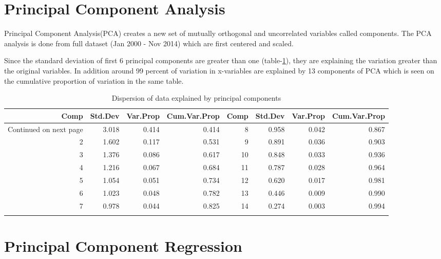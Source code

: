 \documentclass[12pt, lot, lof]{thesis}\usepackage[]{graphicx}\usepackage[]{color}
\begin{document}

\section{Principal Component Analysis}
\label{sec:pcaAnalysis}

Principal Component Analysis(PCA) creates a new set of mutually orthogonal and uncorrelated variables called components. The PCA analysis is done from full dataset (Jan 2000 - Nov 2014) which are first centered and scaled.

Since the standard deviation of first 6 principal components are greater than one (table-\ref{tbl:pcaSumry}), they are explaining the variation greater than the original variables. In addition around 99 percent of variation in x-variables are explained by 13 components of PCA which is seen on the cumulative proportion of variation in the same table.

{\singlespacing\sffamily
{\footnotesize
\begin{longtable}{rrrr|rrrr}
\caption{Dispersion of data explained by principal components} \\ 
  \hline
\hline
Comp & Std.Dev & Var.Prop & Cum.Var.Prop & Comp & Std.Dev & Var.Prop & Cum.Var.Prop \\ 
  \hline 
\endhead 
\hline 
{\scriptsize Continued on next page} 
\endfoot 
\endlastfoot 
   1 & 3.018 & 0.414 & 0.414 &    8 & 0.958 & 0.042 & 0.867 \\ 
     2 & 1.602 & 0.117 & 0.531 &    9 & 0.891 & 0.036 & 0.903 \\ 
     3 & 1.376 & 0.086 & 0.617 &   10 & 0.848 & 0.033 & 0.936 \\ 
     4 & 1.216 & 0.067 & 0.684 &   11 & 0.787 & 0.028 & 0.964 \\ 
     5 & 1.054 & 0.051 & 0.734 &   12 & 0.620 & 0.017 & 0.981 \\ 
     6 & 1.023 & 0.048 & 0.782 &   13 & 0.446 & 0.009 & 0.990 \\ 
     7 & 0.978 & 0.044 & 0.825 &   14 & 0.274 & 0.003 & 0.994 \\ 
   \hline
\hline
\label{tbl:pcaSumry}
\end{longtable}
}

}

\section{Principal Component Regression}
\label{sec:pcrAnalysis}
\end{document}
